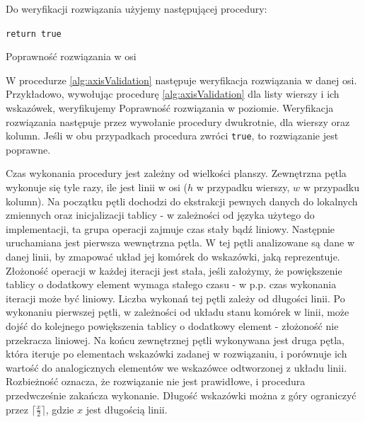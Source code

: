     Do weryfikacji rozwiązania użyjemy następującej procedury:

\begin{pseudokod}[H]
    \texttt{return true}\;
    \caption{Poprawność rozwiązania w osi}\label{alg:axisValidation}
\end{pseudokod}

    W procedurze \ref{alg:axisValidation} następuje weryfikacja rozwiązania w danej osi. Przykładowo,
wywołując procedurę \ref{alg:axisValidation} dla listy wierszy i ich wskazówek, weryfikujemy Poprawność
rozwiązania w poziomie. Weryfikacja rozwiązania następuje przez wywołanie procedury dwukrotnie,
dla wierszy oraz kolumn. Jeśli w obu przypadkach procedura zwróci \texttt{true}, to rozwiązanie jest poprawne.

    Czas wykonania procedury jest zależny od wielkości planszy. Zewnętrzna pętla wykonuje się
tyle razy, ile jest linii w osi ($h$ w przypadku wierszy, $w$ w przypadku kolumn). Na początku pętli
dochodzi do ekstrakcji pewnych danych do lokalnych zmiennych oraz inicjalizacji tablicy - w zależności
od języka użytego do implementacji, ta grupa operacji zajmuje czas stały bądź liniowy. Następnie
uruchamiana jest pierwsza wewnętrzna pętla. W tej pętli analizowane są dane w danej linii, by zmapować
układ jej komórek do wskazówki, jaką reprezentuje. Złożoność operacji w każdej iteracji jest stała,
jeśli założymy, że powiększenie tablicy o dodatkowy element wymaga stałego czasu - w p.p. czas wykonania
iteracji może być liniowy. Liczba wykonań tej pętli zależy od długości linii.
Po wykonaniu pierwszej pętli, w zależności od układu stanu komórek w linii,
może dojść do kolejnego powiększenia tablicy o dodatkowy element - złożoność nie przekracza liniowej.
Na końcu zewnętrznej pętli wykonywana jest druga pętla, która iteruje po elementach wskazówki zadanej
w rozwiązaniu, i porównuje ich wartość do analogicznych elementów we wskazówce odtworzonej z układu linii.
Rozbieżność oznacza, że rozwiązanie nie jest prawidłowe, i procedura przedwcześnie zakańcza wykonanie.
Długość wskazówki można z góry ograniczyć przez $\lceil \frac{x}{2} \rceil$, gdzie $x$ jest długością
linii.

